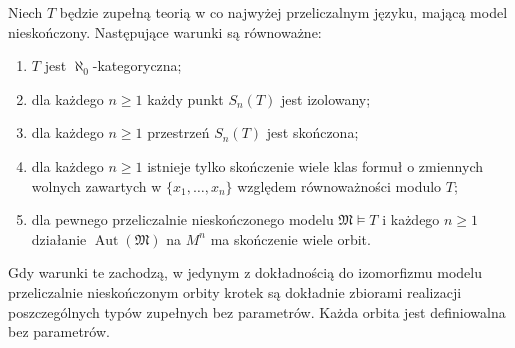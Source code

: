 \begin{twierdzenie}
\label{thm:mod-ryll-nardzewski}
Niech $T$ będzie zupełną teorią w co najwyżej
przeliczalnym języku, mającą model nieskończony.
Następujące warunki są równoważne:
\begin{enumerate}[label=(\roman*)]
\item $T$ jest $\aleph_0$-kategoryczna;
\item dla każdego $n\geq1$ każdy punkt $S_n(T)$
jest izolowany;
\item dla każdego $n\geq1$ przestrzeń $S_n(T)$
jest skończona;
\item dla każdego $n\geq1$ istnieje tylko skończenie
wiele klas formuł o zmiennych wolnych zawartych
w $\{x_1,\ldots,x_n\}$ względem równoważności
modulo $T$;
\item dla pewnego przeliczalnie nieskończonego modelu
$\mathfrak M\models T$ i każdego $n\geq1$
działanie $\operatorname{Aut}(\mathfrak M)$
na $M^n$ ma skończenie wiele orbit.
\end{enumerate}
Gdy warunki te zachodzą, w jedynym z dokładnością
do izomorfizmu modelu przeliczalnie nieskończonym
orbity krotek
są dokładnie zbiorami realizacji poszczególnych
typów zupełnych bez parametrów. Każda orbita
jest definiowalna bez parametrów.
\end{twierdzenie}
